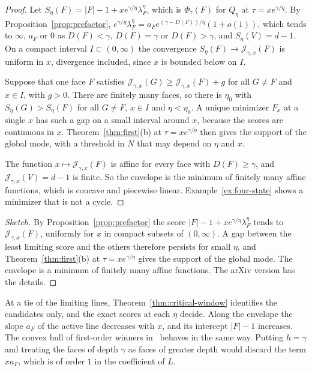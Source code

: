 \ifarxivbuild
\begin{proof}
Let $S_\eta(F)=|F|-1+xe^{\gamma/\eta}\lambda^\eta_F$, which is
$\Phi_\tau(F)$ for $Q_\eta$ at $\tau=xe^{\gamma/\eta}$. By
Proposition~\ref{prop:prefactor},
$e^{\gamma/\eta}\lambda^\eta_F=a_Fe^{(\gamma-D(F))/\eta}(1+o(1))$, which tends to
$\infty$, $a_F$ or $0$ as $D(F)<\gamma$, $D(F)=\gamma$ or $D(F)>\gamma$, and
$S_\eta(V)=d-1$. On a compact interval $I\subset(0,\infty)$ the convergence
$S_\eta(F)\to \mathcal J_{\gamma,x}(F)$ is uniform in $x$, divergence included, since
$x$ is bounded below on $I$.

Suppose that one face $F$ satisfies $\mathcal J_{\gamma,x}(G)\ge \mathcal J_{\gamma,x}(F)+g$ for
all $G\ne F$ and $x\in I$, with $g>0$. There are finitely many faces, so there
is $\eta_0$ with $S_\eta(G)>S_\eta(F)$ for all $G\ne F$, $x\in I$ and
$\eta<\eta_0$. A unique minimizer $F_x$ at a single $x$ has such a gap on a
small interval around $x$, because the scores are continuous in $x$.
Theorem~\ref{thm:first}(b) at $\tau=xe^{\gamma/\eta}$ then gives the support
of the global mode, with a threshold in $N$ that may depend on $\eta$ and $x$.

The function $x\mapsto \mathcal J_{\gamma,x}(F)$ is affine for every face with
$D(F)\ge\gamma$, and $\mathcal J_{\gamma,x}(V)=d-1$ is finite. So the envelope is the
minimum of finitely many affine functions, which is concave and piecewise
linear. Example~\ref{ex:four-state} shows a minimizer that is not a cycle.
\end{proof}
\else
\begin{proof}[Sketch]
By Proposition~\ref{prop:prefactor} the score $|F|-1+xe^{\gamma/\eta}\lambda^\eta_F$ tends to
$\mathcal J_{\gamma,x}(F)$, uniformly for $x$ in compact subsets of $(0,\infty)$. A gap between
the least limiting score and the others therefore persists for small $\eta$, and
Theorem~\ref{thm:first}(b) at $\tau=xe^{\gamma/\eta}$ gives the support of the global mode. The
envelope is a minimum of finitely many affine functions. The arXiv version has the details.
\end{proof}
\fi

At a tie of the limiting lines, Theorem~\ref{thm:critical-window} identifies
the candidates only, and the exact scores at each $\eta$ decide. Along the
envelope the slope $a_F$ of the active line decreases with $x$, and its
intercept $|F|-1$ increases. The convex hull of first-order winners
in~\cite[Theorem~4.4]{paperC1} behaves in the same way.
Putting $h=\gamma$ and treating the faces of depth $\gamma$ as faces of greater
depth would discard the term $xa_F$, which is of order $1$ in the coefficient
of $L$.

